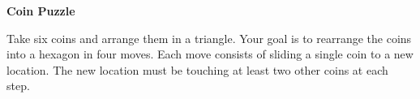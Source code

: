 \documentclass[11pt]{article}
\begin{document}
\newpage 

\begin{center}
\textbf{Coin Puzzle}
\end{center} 

Take six coins and arrange them in a triangle. Your goal is to rearrange the coins into a hexagon in four moves. Each move consists of sliding a single coin to a new location. The new location must be touching at least two other coins at each step. 

\end{document}
